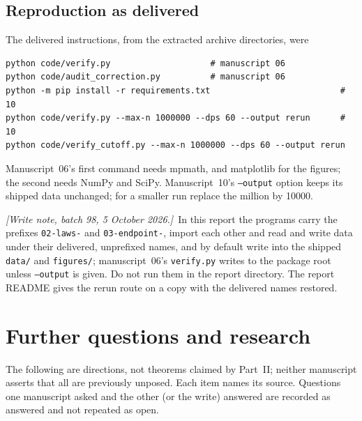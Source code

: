 \documentclass[11pt,a4paper]{article}
\numberwithin{equation}{section}
\theoremstyle{definition}
\theoremstyle{remark}
\newcommand{\writenoteB}[1]{\par\smallskip\noindent
 \textit{[Write note, batch 98, 5 October 2026.]}\ #1\par\smallskip}
\begin{document}
\subsection{Reproduction as delivered}
The delivered instructions, from the extracted archive directories, were
\begin{verbatim}
python code/verify.py                    # manuscript 06
python code/audit_correction.py          # manuscript 06
python -m pip install -r requirements.txt                          # 10
python code/verify.py --max-n 1000000 --dps 60 --output rerun      # 10
python code/verify_cutoff.py --max-n 1000000 --dps 60 --output rerun
\end{verbatim}
Manuscript~06's first command needs mpmath, and matplotlib for the figures;
the second needs NumPy and SciPy. Manuscript~10's \texttt{--output} option
keeps its shipped data unchanged; for a smaller run replace the million by
10000.

\writenoteB{In this report the programs carry the prefixes \texttt{02-laws-}
and \texttt{03-endpoint-}, import each other and read and write data under
their delivered, unprefixed names, and by default write into the shipped
\texttt{data/} and \texttt{figures/}; manuscript~06's \texttt{verify.py} writes
to the package root unless \texttt{--output} is given. Do not run them in the
report directory. The report README gives the rerun route on a copy with the
delivered names restored.}

\section{Further questions and research}
\label{ctp:cl:sec:future}

The following are directions, not theorems claimed by Part~II; neither
manuscript asserts that all are previously unposed. Each item names its
source. Questions one manuscript asked and the other (or the write) answered
are recorded as answered and not repeated as open.
\end{document}
